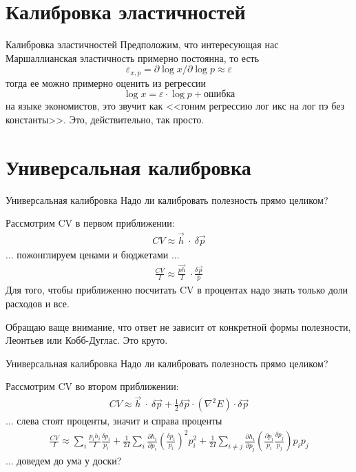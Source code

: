 \documentclass{beamer}
\begin{document}
\section{Калибровка эластичностей}

\begin{frame}{Калибровка эластичностей}
Предположим, что интересующая нас Маршаллианская эластичность примерно постоянна, то есть $$\varepsilon_{x,p} = \partial \log x/\partial \log p \approx \varepsilon$$ тогда ее можно примерно оценить из регрессии
$$\log x = \varepsilon \cdot \log p + \text{ошибка}$$
на языке экономистов, это звучит как <<гоним регрессию лог икс на лог пэ без константы>>. Это, действительно, так просто.
\end{frame}

\section{Универсальная калибровка}

\begin{frame}{Универсальная калибровка}
Надо ли калибровать полезность прямо целиком?

Рассмотрим CV в первом приближении:
\begin{gather}
	CV \approx \vec h \ \cdot \ \delta \vec p
\end{gather}
... пожонглируем ценами и бюджетами ...
\begin{gather*}
	\frac{CV}{I} \approx \frac{\vec {p h}}{I} \ \cdot \frac{\delta \vec p}{p}
\end{gather*}
Для того, чтобы приближенно посчитать CV в процентах надо знать только доли расходов и все. 

Обращаю ваще внимание, что ответ не зависит от конкретной формы полезности, Леонтьев или Кобб-Дуглас. Это круто.
\end{frame}

\begin{frame}{Универсальная калибровка}
Надо ли калибровать полезность прямо целиком?

Рассмотрим CV во втором приближении:
\begin{gather*}
	CV \approx \vec h \ \cdot \ \delta \vec p + \frac{1}{2} \delta \vec p \cdot (\nabla^2 E) \cdot \delta \vec p
\end{gather*}
... слева стоят проценты, значит и справа проценты
\begin{gather*}
	\frac{CV}{I} \approx \sum_i \frac{p_i h_i}{I} \frac{\delta p_i}{p_i}  + \frac{1}{2I}\sum_i \frac{\partial h_i}{\partial p_i} (\frac{\delta p_i}{p_i})^2p_i^2 + \frac{1}{2I}\sum_{i \neq j} \frac{\partial h_i}{\partial p_j} (\frac{\partial p_i}{p_i}\frac{\delta p_j}{p_j})p_ip_j
\end{gather*}
... доведем до ума у доски?
\end{frame}
\end{document}
